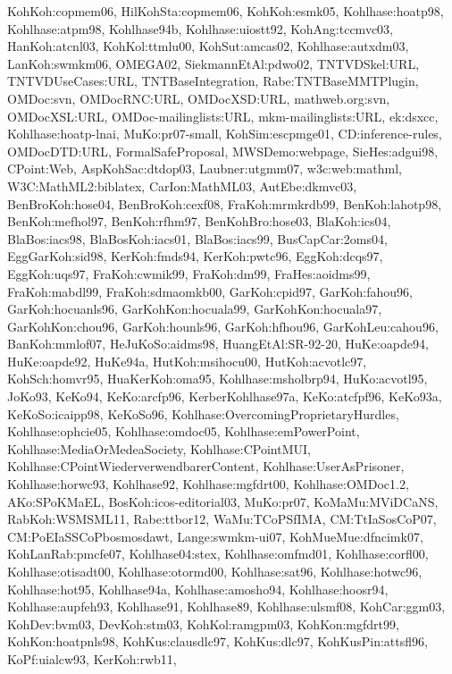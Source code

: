 {KohKoh:copmem06,%
HilKohSta:copmem06,%
KohKoh:esmk05,%
Kohlhase:hoatp98,%
Kohlhase:atpm98,%
Kohlhase94b,%
Kohlhase:uiostt92,%
KohAng:tccmvc03,%
HanKoh:atcnl03,%
KohKol:ttmlu00,%
KohSut:amcas02,%
Kohlhase:autxdm03,%
LanKoh:swmkm06,%
OMEGA02,%
SiekmannEtAl:pdwo02,%
TNTVDSkel:URL,%
TNTVDUseCases:URL,%
TNTBaseIntegration,%
Rabe:TNTBaseMMTPlugin,%
OMDoc:svn,%
OMDocRNC:URL,%
OMDocXSD:URL,%
mathweb.org:svn,%
OMDocXSL:URL,%
OMDoc-mailinglists:URL,%
mkm-mailinglists:URL,%
ek:dsxcc,%
Kohlhase:hoatp-lnai,%
MuKo:pr07-small,%
KohSim:escpmge01,%
CD:inference-rules,%
OMDocDTD:URL,%
FormalSafeProposal,%
MWSDemo:webpage,%
SieHes:adgui98,%
CPoint:Web,%
AspKohSac:dtdop03,%
Laubner:utgmm07,%
w3c:web:mathml,%
W3C:MathML2:biblatex,%
CarIon:MathML03,%
AutEbe:dkmvc03,%
BenBroKoh:hose04,%
BenBroKoh:cexf08,%
FraKoh:mrmkrdb99,%
BenKoh:lahotp98,%
BenKoh:mefhol97,%
BenKoh:rfhm97,%
BenKohBro:hose03,%
BlaKoh:ics04,%
BlaBos:iacs98,%
BlaBosKoh:iacs01,%
BlaBos:iacs99,%
BusCapCar:2oms04,%
EggGarKoh:sid98,%
KerKoh:fmds94,%
KerKoh:pwtc96,%
EggKoh:dcqs97,%
EggKoh:uqs97,%
FraKoh:cwmik99,%
FraKoh:dm99,%
FraHes:aoidms99,%
FraKoh:mabdl99,%
FraKoh:sdmaomkb00,%
GarKoh:cpid97,%
GarKoh:fahou96,%
GarKoh:hocuanls96,%
GarKohKon:hocuala99,%
GarKohKon:hocuala97,%
GarKohKon:chou96,%
GarKoh:hounls96,%
GarKoh:hfhou96,%
GarKohLeu:cahou96,%
BanKoh:mmlof07,%
HeJuKoSo:aidms98,%
HuangEtAl:SR-92-20,%
HuKe:oapde94,%
HuKe:oapde92,%
HuKe94a,%
HutKoh:msihocu00,%
HutKoh:acvotlc97,%
KohSch:homvr95,%
HuaKerKoh:oma95,%
Kohlhase:msholbrp94,%
HuKo:acvotl95,%
JoKo93,%
KeKo94,%
KeKo:arcfp96,%
KerberKohlhase97a,%
KeKo:atcfpf96,%
KeKo93a,%
KeKoSo:icaipp98,%
KeKoSo96,%
Kohlhase:OvercomingProprietaryHurdles,%
Kohlhase:ophcie05,%
Kohlhase:omdoc05,%
Kohlhase:emPowerPoint,%
Kohlhase:MediaOrMedeaSociety,%
Kohlhase:CPointMUI,%
Kohlhase:CPointWiederverwendbarerContent,%
Kohlhase:UserAsPrisoner,%
Kohlhase:horwc93,%
Kohlhase92,%
Kohlhase:mgfdrt00,%
Kohlhase:OMDoc1.2,%
AKo:SPoKMaEL,%
BosKoh:icos-editorial03,%
MuKo:pr07,%
KoMaMu:MViDCaNS,%
RabKoh:WSMSML11,%
Rabe:ttbor12,%
WaMu:TCoPSfIMA,%
CM:TtIaSosCoP07,%
CM:PoEIaSSCoPbosmosdawt,%
Lange:swmkm-ui07,%
KohMueMue:dfncimk07,%
KohLanRab:pmcfe07,%
Kohlhase04:stex,%
Kohlhase:omfmd01,%
Kohlhase:corfl00,%
Kohlhase:otisadt00,%
Kohlhase:otormd00,%
Kohlhase:sat96,%
Kohlhase:hotwc96,%
Kohlhase:hot95,%
Kohlhase94a,%
Kohlhase:amosho94,%
Kohlhase:hoosr94,%
Kohlhase:aupfeh93,%
Kohlhase91,%
Kohlhase89,%
Kohlhase:ulsmf08,%
KohCar:ggm03,%
KohDev:bvm03,%
DevKoh:stm03,%
KohKol:ramgpm03,%
KohKon:mgfdrt99,%
KohKon:hoatpnls98,%
KohKus:clausdlc97,%
KohKus:dlc97,%
KohKusPin:attsfl96,%
KoPf:uialcw93,%
KerKoh:rwb11,%
}
